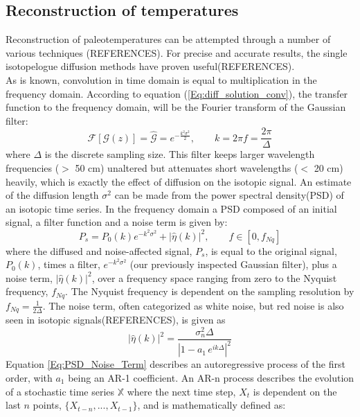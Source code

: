 \documentclass[../../CompleteThesis2/Complete_2ndDraft]{subfiles}
\begin{document}
\subsection{Reconstruction of temperatures}
\label{Subsec:Ice_DiffusionAndDensification_Diffusion_TemperatureRecon}
Reconstruction of paleotemperatures can be attempted through a number of various techniques (REFERENCES). For precise and accurate results, the single isotopelogue diffusion methods have proven useful(REFERENCES).\\
As is known, convolution in time domain is equal to multiplication in the frequency domain. According to equation (\ref{Eq:diff_solution_conv}), the transfer function to the frequency domain, will be the Fourier transform of the Gaussian filter:
\begin{equation}
	\mathcal{F}[\mathcal{G}(z)] = \hat{\mathcal{G}} = e^{-\frac{k^2\sigma^2}{2}}, \qquad k = 2\pi f = \frac{2\pi}{\Delta}
	\label{Eq:Transer_Fct}
\end{equation} 
where $\Delta$ is the discrete sampling size. This filter keeps larger wavelength frequencies ($>$ 50 cm) unaltered but attenuates short wavelengths ($<$ 20 cm) heavily, which is exactly the effect of diffusion on the isotopic signal. An estimate of the diffusion length $\sigma^2$ can be made from the power spectral density(PSD) of an isotopic time series. In the frequency domain a PSD composed of an initial signal, a filter function and a noise term is given by:
\begin{equation}
	P_s = P_0(k) e^{-k^2\sigma^2} + |\hat{\eta}(k)|^2, \qquad f \in [0, f_{Nq}]
	\label{Eq:PSD_general}
\end{equation} 
where the diffused and noise-affected signal, $P_s$, is equal to the original signal, $P_0(k)$, times a filter, $e^{-k^2\sigma^2}$ (our previously inspected Gaussian filter), plus a noise term, $|\hat{\eta}(k)|^2$, over a frequency space ranging from zero to the Nyquist frequency, $f_{Nq}$. The Nyquist frequency is dependent on the sampling resolution by $f_{Nq} = \frac{1}{2\Delta}$.
The noise term, often categorized as white noise, but red noise is also seen in isotopic signals(REFERENCES), is given as
\begin{equation}
	|\hat{\eta}(k)|^2 = \frac{\sigma_n^2 \Delta}{|1 - a_1 \, e^{ik\Delta}|^2}
	\label{Eq:PSD_Noise_Term}
\end{equation}
Equation \ref{Eq:PSD_Noise_Term} describes an autoregressive process of the first order, with $a_1$ being an AR-1 coefficient. An AR-n process describes the evolution of a stochastic time series $\mathbb{X}$ where the next time step, $X_t$ is dependent on the last $n$ points, $\{X_{t-n},...,X_{t-1}\}$, and is mathematically defined as:
\end{document}
